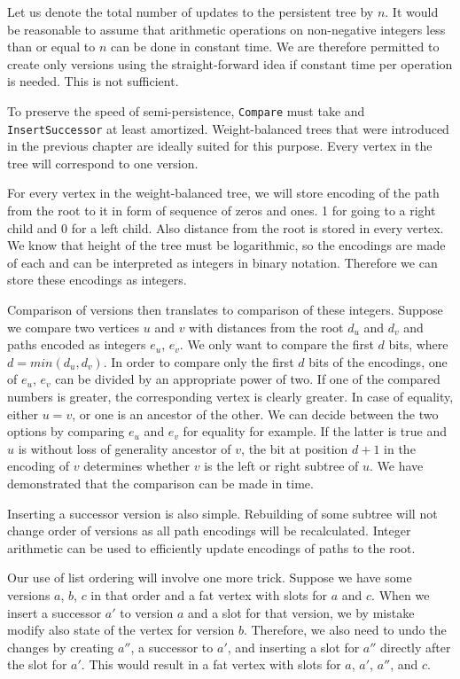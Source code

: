 Let us denote the total number of updates to the persistent tree by $n$. It would be reasonable to  assume that arithmetic operations on non-negative integers less than or equal to $n$ can be done in constant time. We are therefore permitted to create only  versions using the straight-forward idea if constant time per operation is needed. This is not sufficient.

To preserve the speed of semi-persistence, \texttt{Compare} must take  and \linebreak \texttt{InsertSuccessor}  at least amortized. Weight-balanced trees that were introduced in the previous chapter are ideally suited for this purpose. Every vertex in the tree will correspond to one version.

For every vertex in the weight-balanced tree, we will store encoding of the path from the root to it in form of sequence of zeros and ones. 1 for going to a right child and 0 for a left child. Also distance from the root is stored in every vertex. We know that height of the tree must be logarithmic, so the encodings are made of  each and can be interpreted as integers in binary notation. Therefore we can store these encodings as integers.

Comparison of versions then translates to comparison of these integers.
Suppose we compare two vertices $u$ and $v$ with distances from the root $d_u$ and $d_v$ and paths encoded as integers $e_u$, $e_v$. 
We only want to compare the first $d$ bits, where $d = min(d_u,d_v)$. 
In order to compare only the first $d$ bits of the encodings, one of $e_u$, $e_v$ can be divided by an appropriate power of two. 
If one of the compared numbers is greater, the corresponding vertex is clearly greater. 
In case of equality, either $u = v$, or one is an ancestor of the other. We can decide between the two options by comparing $e_u$ and $e_v$ for equality for example. 
If the latter is true and $u$ is without loss of generality ancestor of $v$, the bit at position $d+1$ in the encoding of $v$ determines whether $v$ is the left or right subtree of $u$. 
We have demonstrated that the comparison can be made in  time. 

Inserting a successor version is also simple. Rebuilding of some subtree will not change order of versions as all path encodings will be recalculated. Integer arithmetic can be used to efficiently update encodings of paths to the root.

Our use of list ordering will involve one more trick. 
Suppose we have some versions $a$, $b$, $c$ in that order and a fat vertex with slots for $a$ and $c$. 
When we insert a successor $a'$ to version $a$ and a slot for that version, we by mistake modify also state of the vertex for version $b$. 
Therefore, we also need to undo the changes by creating $a''$, a successor to $a'$, and inserting a slot for $a''$ directly after the slot for $a'$. 
This would result in a fat vertex with slots for $a$, $a'$, $a''$, and $c$.

